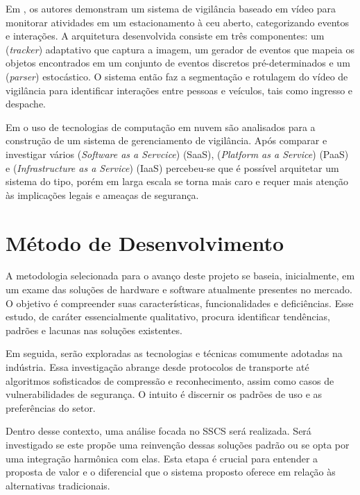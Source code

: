 \documentclass[12pt, %
openright, 
oneside, %
a4paper,    %
brazil]{facom-ufu-abntex2}
\begin{document}
Em , os autores demonstram um sistema de vigilância baseado
em vídeo para monitorar atividades em um estacionamento à ceu aberto,
categorizando eventos e interações. A arquitetura desenvolvida consiste em três
componentes: um (\textit{\foreignlanguage{english}{tracker}}) adaptativo que
captura a imagem, um gerador de eventos que mapeia os objetos encontrados em um
conjunto de eventos discretos pré-determinados e um
(\textit{\foreignlanguage{english}{parser}}) estocástico. O sistema então faz a
segmentação e rotulagem do vídeo de vigilância para identificar interações
entre pessoas e veículos, tais como ingresso e despache.

Em  o uso de tecnologias de computação em nuvem são
analisados para a construção de um sistema de gerenciamento de vigilância. Após
comparar e investigar vários (\textit{\foreignlanguage{english}{Software as a
		Servcice}}) (SaaS), (\textit{\foreignlanguage{english}{Platform as a Service}})
(PaaS) e (\textit{\foreignlanguage{english}{Infrastructure as a Service}})
(IaaS) percebeu-se que é possível arquitetar um sistema do tipo, porém em larga
escala se torna mais caro e requer mais atenção às implicações legais e ameaças
de segurança.

\chapter{Método de Desenvolvimento}

A metodologia selecionada para o avanço deste projeto se baseia, inicialmente,
em um exame das soluções de hardware e software atualmente presentes no
mercado. O objetivo é compreender suas características, funcionalidades e
deficiências. Esse estudo, de caráter essencialmente qualitativo, procura
identificar tendências, padrões e lacunas nas soluções existentes.

Em seguida, serão exploradas as tecnologias e técnicas comumente adotadas na
indústria. Essa investigação abrange desde protocolos de transporte até
algoritmos sofisticados de compressão e reconhecimento, assim como casos de
vulnerabilidades de segurança. O intuito é discernir os padrões de uso e as
preferências do setor.

Dentro desse contexto, uma análise focada no SSCS será realizada. Será
investigado se este propõe uma reinvenção dessas soluções padrão ou se opta por
uma integração harmônica com elas. Esta etapa é crucial para entender a
proposta de valor e o diferencial que o sistema proposto oferece em relação às
alternativas tradicionais.
\end{document}
